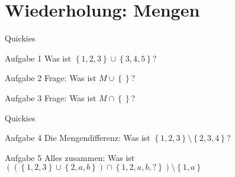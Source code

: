 \section{Wiederholung: Mengen}
\begin{frame}{Quickies}
    \begin{exampleblock}{Aufgabe 1}
        Was ist $\left\{ 1, 2, 3\right\} \cup \left\{ 3, 4, 5\right\}$?\\
        \pause
    \end{exampleblock}
    \begin{exampleblock}{Aufgabe 2}
        Frage: Was ist $ M \cup \left\{\right\}$?\\
        \pause
    \end{exampleblock}
    \begin{exampleblock}{Aufgabe 3}
        Frage: Was ist $M \cap \left\{\right\}$?\\
        \pause
    \end{exampleblock}
\end{frame}

\begin{frame}{Quickies}
    \begin{exampleblock}{Aufgabe 4}
        Die Mengendifferenz: Was ist $\left\{ 1, 2, 3\right\} \setminus \left\{ 2, 3, 4\right\}$?\\
        \pause
    \end{exampleblock}
    \begin{exampleblock}{Aufgabe 5}
        Alles zusammen: Was ist $\left(\left(\left\{ 1, 2, 3\right\} \cup \left\{ 2, a, b\right\}\right) \cap \left\{ 1, 2, a, b, ?\right\}\right) \setminus \left\{ 1, a\right\}$\\
        \pause
    \end{exampleblock}
\end{frame}

